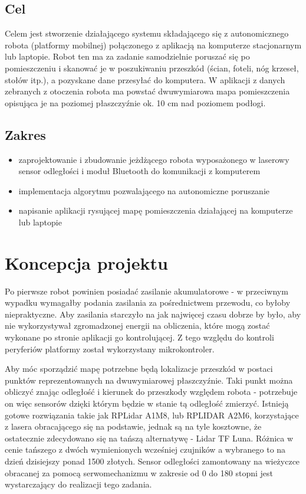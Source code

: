 \subsection{Cel}
Celem jest stworzenie działającego systemu składającego się z autonomicznego robota (platformy mobilnej) połączonego z aplikacją na komputerze stacjonarnym lub laptopie. Robot ten ma za zadanie samodzielnie poruszać się po pomieszczeniu i skanować je w poszukiwaniu przeszkód (ścian, foteli, nóg krzeseł, stołów itp.), a pozyskane dane przesyłać do komputera. W
aplikacji z danych zebranych z otoczenia robota ma powstać dwuwymiarowa mapa pomieszczenia opisująca je na poziomej płaszczyźnie ok. 10 cm nad poziomem podłogi.

\subsection{Zakres}
\begin{itemize}
    \item zaprojektowanie i zbudowanie jeżdżącego robota wyposażonego w laserowy sensor odległości i moduł Bluetooth do komunikacji z komputerem
    \item implementacja algorytmu pozwalającego na autonomiczne poruszanie
    \item napisanie aplikacji rysującej mapę pomieszczenia działającej na komputerze lub laptopie
\end{itemize}


\section{Koncepcja projektu}
Po pierwsze robot powinien posiadać zasilanie akumulatorowe - w przeciwnym wypadku wymagałby podania zasilania za pośrednictwem przewodu, co byłoby niepraktyczne. Aby zasilania starczyło na jak najwięcej czasu dobrze by było, aby nie wykorzystywał zgromadzonej energii na obliczenia, które mogą zostać wykonane po stronie aplikacji go kontrolującej. Z tego względu do kontroli peryferiów platformy został wykorzystany mikrokontroler.

Aby móc sporządzić mapę potrzebne będą lokalizacje przeszkód w postaci punktów reprezentowanych na dwuwymiarowej płaszczyźnie. Taki punkt można obliczyć znając odległość i kierunek do przeszkody względem robota - potrzebuje on więc  sensorów dzięki którym będzie w stanie tą odległość zmierzyć. Istnieją gotowe rozwiązania takie jak RPLidar A1M8, lub RPLIDAR A2M6, korzystające z lasera obracającego się na podstawie, jednak są na tyle kosztowne, że ostatecznie zdecydowano się na tańszą alternatywę - Lidar TF Luna. Różnica w cenie tańszego z dwóch wymienionych wcześniej czujników a wybranego to na dzień dzisiejszy ponad 1500 złotych. Sensor odległości zamontowany na wieżyczce obracanej za pomocą serwomechanizmu  w zakresie od 0 do 180 stopni jest wystarczający do realizacji tego zadania.

